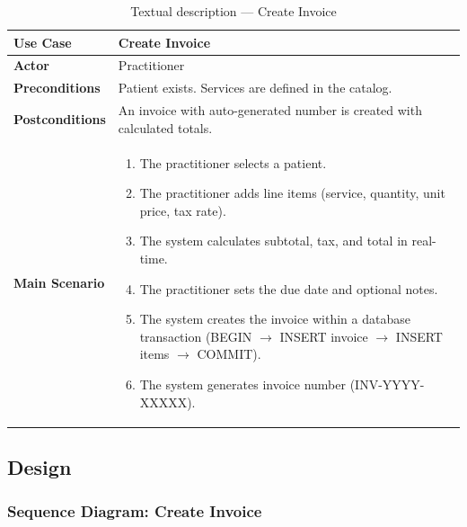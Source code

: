 \documentclass[12pt,a4paper,oneside]{report}
\begin{document}
\begin{table}[H]
\centering
\caption{Textual description — Create Invoice}
\label{tab:uc_create_invoice}
\begin{tabular}{|p{3.5cm}|p{9.5cm}|}
\hline
\textbf{Use Case} & Create Invoice \\
\hline
\textbf{Actor} & Practitioner \\
\hline
\textbf{Preconditions} & Patient exists. Services are defined in the catalog. \\
\hline
\textbf{Postconditions} & An invoice with auto-generated number is created with calculated totals. \\
\hline
\textbf{Main Scenario} &
\begin{enumerate}[leftmargin=*, nosep]
    \item The practitioner selects a patient.
    \item The practitioner adds line items (service, quantity, unit price, tax rate).
    \item The system calculates subtotal, tax, and total in real-time.
    \item The practitioner sets the due date and optional notes.
    \item The system creates the invoice within a database transaction (BEGIN $\rightarrow$ INSERT invoice $\rightarrow$ INSERT items $\rightarrow$ COMMIT).
    \item The system generates invoice number (INV-YYYY-XXXXX).
\end{enumerate} \\
\hline
\end{tabular}
\end{table}

\subsection{Design}

\subsubsection{Sequence Diagram: Create Invoice}
\end{document}
